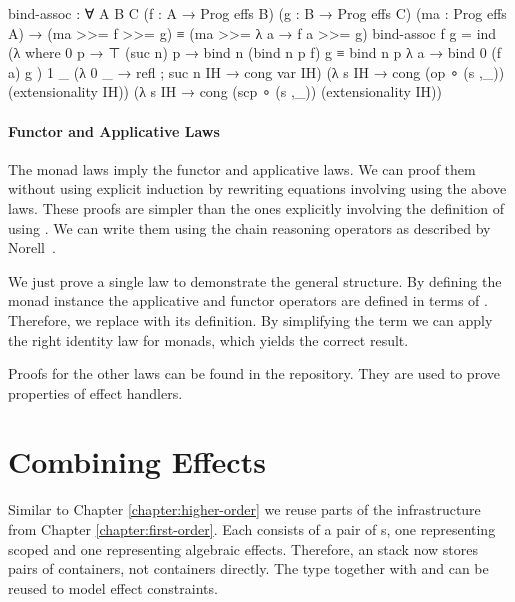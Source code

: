 \begin{code}
bind-assoc : ∀ {A B C}
  (f : A → Prog effs B) (g : B → Prog effs C) (ma : Prog effs A) →
  (ma >>= f >>= g) ≡ (ma >>= λ a → f a >>= g)
bind-assoc f g = ind
  (λ where
    0 p        → ⊤
    (suc n) p  → bind n (bind n p f) g ≡ bind n p λ a → bind 0 (f a) g
  ) 1 _
  (λ{ {0} _ → refl ; {suc n} IH → cong var IH})
  (λ s IH → cong (op   ∘ (s ,_)) (extensionality IH))
  (λ s IH → cong (scp  ∘ (s ,_)) (extensionality IH))
\end{code}

\paragraph{Functor and Applicative Laws}
The monad laws imply the functor and applicative laws.
We can proof them without using explicit induction by rewriting equations
involving \AgdaFunction{>>=} using the above laws.
These proofs are simpler than the ones explicitly involving the definition of
\AgdaFunction{>>=} using .
We can write them using the chain reasoning operators as described by
Norell~\cite{norell:thesis}.

We just prove a single law to demonstrate the general structure.
By defining the monad instance the applicative and functor operators are 
defined in terms of \AgdaFunction{>>=}.
Therefore, we replace \AgdaFunction{<\$>} with its definition.
By simplifying the term we can apply the right identity law for monads, which
yields the correct result.

Proofs for the other laws can be found in the repository.
They are used to prove properties of effect handlers.


\section{Combining Effects}

Similar to Chapter \ref{chapter:higher-order} we reuse parts of the
infrastructure from Chapter \ref{chapter:first-order}.
Each  consists of a pair of s, one
representing scoped and one representing algebraic effects.
Therefore, an  stack now stores pairs of containers, not
containers directly.
The type  together with  and
 can be reused to model effect constraints.

